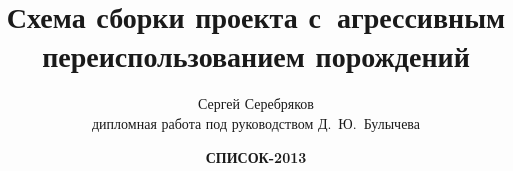 \title{Схема сборки проекта с~агрессивным переиспользованием порождений}
	   
\author[Сергей Серебряков]{
	Сергей Серебряков\\
	\footnotesize{дипломная работа под руководством Д.~Ю.~Булычева}
}


\date{
	\textbf{СПИСОК-2013}
}